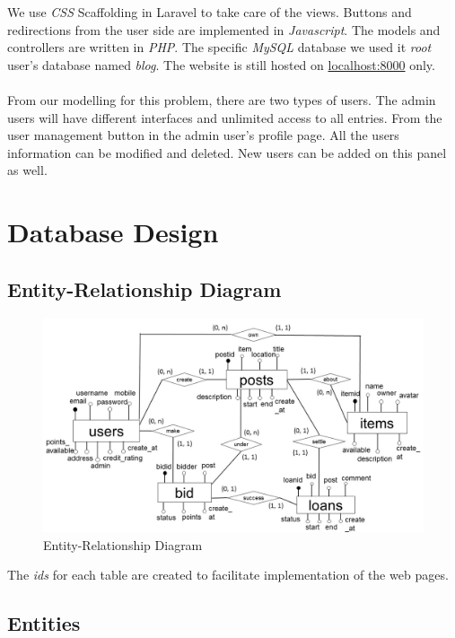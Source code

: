 We use \textit{CSS} Scaffolding in Laravel to take care of the views. Buttons and redirections from the user side are implemented in \textit{Javascript}. The models and controllers are written in \textit{PHP}. The specific \textit{MySQL} database we used it \textit{root} user's database named \textit{blog}. The website is still hosted on \url{localhost:8000} only.\\
\\
From our modelling for this problem, there are two types of users. The admin users will have different interfaces and unlimited access to all entries. From the user management button in the admin user's profile page. All the users information can be modified and deleted. New users can be added on this panel as well.

\section{Database Design}

\subsection{Entity-Relationship Diagram}
\begin{figure}[h]
      \centering
	\includegraphics[scale=0.5]{er.jpg}
      \caption{Entity-Relationship Diagram}
\end{figure}

The \textit{ids} for each table are created to facilitate implementation of the web pages.

\newpage

\subsection{Entities}

